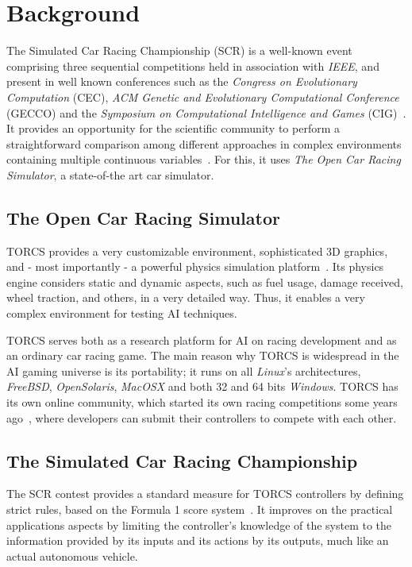 \section{Background}\label{sec:background}

The Simulated Car Racing Championship (SCR) is a well-known event comprising 
three sequential competitions held in association with \textit{IEEE}, and 
present in well known conferences such as the \textit{Congress on Evolutionary 
Computation} (CEC), \textit{ACM Genetic and Evolutionary Computational Conference} 
(GECCO) and the \textit{Symposium on Computational Intelligence and Games} 
(CIG)~\cite{scr2009}.  It provides an opportunity for the scientific community 
to perform a straightforward comparison among different approaches in complex 
environments containing multiple continuous variables~\cite{caldeira_2013}. For 
this, it uses \emph{The Open Car Racing Simulator}, a state-of-the art car simulator. 

\subsection{The Open Car Racing Simulator}
TORCS provides a very customizable environment, sophisticated 3D graphics, and -
most importantly - a powerful physics simulation platform~\cite{manual}. Its 
physics engine considers static and dynamic aspects, such as fuel usage, damage 
received, wheel traction, and others, in a very detailed way. Thus, it enables 
a very complex environment for testing AI techniques.

TORCS serves both as a research platform for AI on racing development and as an 
ordinary car racing game. The main reason why TORCS is widespread in the AI gaming 
universe is its portability; it runs on all \textit{Linux}'s architectures,
\textit{FreeBSD}, \textit{OpenSolaris}, \textit{MacOSX} and both 32 and 64 bits 
\textit{Windows}. TORCS has its own online community, which started its own 
racing competitions some years ago~\cite{TORCS}, where developers can submit 
their controllers to compete with each other.

\subsection{The Simulated Car Racing Championship}
The SCR contest provides a standard measure for TORCS controllers by defining strict
rules, based on the Formula 1 score system~\cite{scr2009}. It improves on the 
practical applications aspects by limiting the controller's knowledge of 
the system to the information provided by its inputs and its actions by its outputs,
much like an actual autonomous vehicle.

